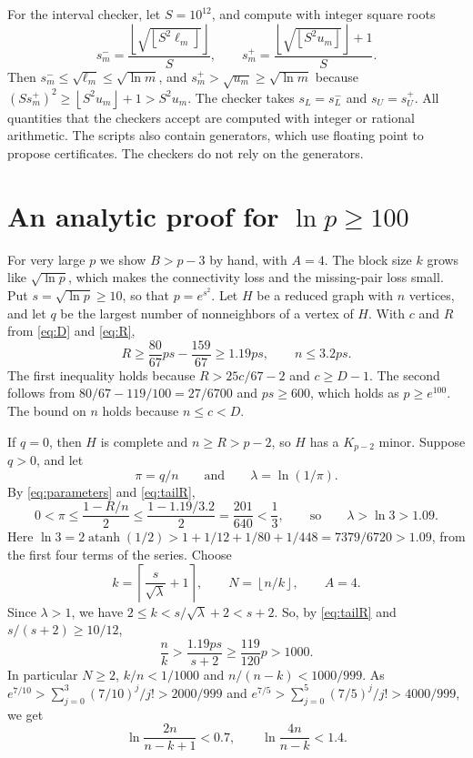 \documentclass[11pt]{article}
\DeclareMathOperator{\atanh}{atanh}
\newcommand{\floor}[1]{\left\lfloor#1\right\rfloor}
\newcommand{\ceil}[1]{\left\lceil#1\right\rceil}
\begin{document}
For the interval checker, let $S=10^{12}$, and compute with integer square
roots
\begin{equation*}
 s_m^- =\frac{\floor{\sqrt{\floor{S^2\ell_m}}}}S,
 \qquad
 s_m^+ =\frac{\floor{\sqrt{\floor{S^2u_m}}}+1}S.
\end{equation*}
Then $s_m^-\le\sqrt{\ell_m}\le\sqrt{\ln m}$, and $s_m^+>\sqrt{u_m}\ge\sqrt{\ln
m}$ because $(Ss_m^+)^2\ge\floor{S^2u_m}+1>S^2u_m$. The checker takes
$s_L=s_L^-$ and $s_U=s_U^+$. All quantities that the checkers accept are
computed with integer or rational arithmetic. The scripts also contain
generators, which use floating point to propose certificates. The checkers do
not rely on the generators.

\section{An analytic proof for \texorpdfstring{$\ln p\ge100$}{ln p >= 100}}\label{sec:tail}

For very large $p$ we show $B>p-3$ by hand, with $A=4$. The block size $k$
grows like $\sqrt{\ln p}$, which makes the connectivity loss and the
missing-pair loss small. Put $s=\sqrt{\ln p}\ge10$, so that $p=e^{s^2}$. Let
$H$ be a reduced graph with $n$ vertices, and let $q$ be the largest number of
nonneighbors of a vertex of $H$. With $c$ and $R$ from \eqref{eq:D} and
\eqref{eq:R},
\begin{equation}\label{eq:tailR}
 R\ge\frac{80}{67}ps-\frac{159}{67}\ge1.19ps,
 \qquad n\le3.2ps.
\end{equation}
The first inequality holds because $R>25c/67-2$ and $c\ge D-1$. The second
follows from $80/67-119/100=27/6700$ and $ps\ge600$, which holds as
$p\ge e^{100}$. The bound on $n$ holds
because $n\le c<D$.

If $q=0$, then $H$ is complete and $n\ge R>p-2$, so $H$ has a $K_{p-2}$
minor. Suppose $q>0$, and let
\begin{equation*}
 \pi=q/n\qquad\text{and}\qquad\lambda=\ln(1/\pi).
\end{equation*}
By \eqref{eq:parameters} and \eqref{eq:tailR},
\begin{equation*}
 0<\pi\le\frac{1-R/n}{2}\le\frac{1-1.19/3.2}{2}=\frac{201}{640}<\frac13,
 \qquad\text{so}\qquad \lambda>\ln3>1.09.
\end{equation*}
Here $\ln3=2\atanh(1/2)>1+1/12+1/80+1/448=7379/6720>1.09$, from the first
four terms of the series. Choose
\begin{equation*}
 k=\ceil{\frac{s}{\sqrt\lambda}+1},\qquad
 N=\floor{n/k},\qquad A=4.
\end{equation*}
Since $\lambda>1$, we have $2\le k<s/\sqrt\lambda+2<s+2$. So, by
\eqref{eq:tailR} and $s/(s+2)\ge10/12$,
\begin{equation*}
 \frac nk>\frac{1.19ps}{s+2}\ge\frac{119}{120}p>1000.
\end{equation*}
In particular $N\ge2$, $k/n<1/1000$ and $n/(n-k)<1000/999$. As
$e^{7/10}>\sum_{j=0}^3(7/10)^j/j!>2000/999$ and
$e^{7/5}>\sum_{j=0}^5(7/5)^j/j!>4000/999$, we get
\begin{equation}\label{eq:logs}
 \ln\frac{2n}{n-k+1}<0.7,
 \qquad \ln\frac{4n}{n-k}<1.4.
\end{equation}
\end{document}
